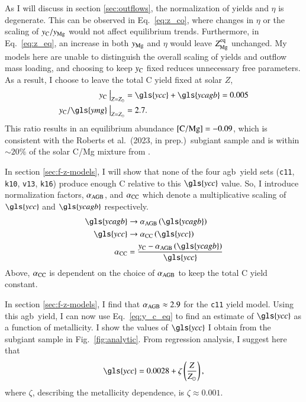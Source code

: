 \documentclass[12pt,oneside,letterpaper]{report}
\newcommand{\agb}{\gls{agb}}
\newcommand{\cxi}{\texttt{\gls{c11}}}
\newcommand{\kx}{\texttt{\gls{k10}}}
\newcommand{\kxvi}{\texttt{\gls{k16}}}
\newcommand{\vxiii}{\texttt{\gls{v13}}}
\newcommand{\Ycc}{\gls{ycc}}
\newcommand{\Yoc}{\gls{ymg}}
\newcommand{\Ycagb}{\gls{ycagb}}
\newcommand{\Yct}{\ensuremath{y_{\rm C}}}
\newcommand{\citetjack}{Roberts et al.~(2023, in prep.)}
\newcommand{\about}[1]{${\sim} #1$}
\begin{document}
As I will discuss in section \ref{sec:outflows}, the normalization of yields and $\eta$ is degenerate. This can be observed in Eq.~\ref{eq:z_co}, where changes in $\eta$ or the scaling of $y_{\rm C}/y_{\rm Mg}$ would not affect equilibrium trends. Furthermore, in Eq.~\ref{eq:z_eq}, an increase in both $y_{\rm Mg}$ and $\eta$ would leave $Z_{\rm Mg}^{\rm eq}$ unchanged. My models here are unable to distinguish the overall scaling of yields and outflow mass loading, and choosing to keep $y_{\rm C}$ fixed reduces unnecessary free parameters. 
%
As a result, I choose to leave the total C yield fixed at solar $Z$,
\begin{subequations}
    \begin{align}
        \Yct~\big\vert_{Z=Z_\odot} &= \Ycc + \Ycagb = 0.005 \\
        \Yct/\Yoc~\big\vert_{Z=Z_\odot} &= 2.7.
    \end{align}
\end{subequations}
This ratio results in an equilibrium abundance ${\rm [C/Mg]} = -0.09$, which is consistent with the \citetjack~\gls{subgiant} sample and is within \about{20\%} of the solar C/Mg mixture from \citet{asplund+09}.

In section \ref{sec:f-z-models}, I will show that none of the four \agb\ yield sets (\cxi{}, \kx{}, \vxiii{}, \kxvi{}) produce enough C relative to this $\Ycc$ value. So, I introduce normalization factors, $\alpha_{\rm AGB}$, and $\alpha_{\rm CC}$ which denote a multiplicative scaling of $\Ycc$ and $\Ycagb$ respectively. 
\begin{subequations} \label{eq:alpha}
    \begin{align}
        \Ycagb &\rightarrow \alpha_{\rm AGB} \left(\Ycagb\right) \\
        \Ycc &\rightarrow \alpha_{\rm CC} \left(\Ycc\right)\\
        \alpha_{\rm CC} &= \frac{\Yct - \alpha_{\rm AGB} \left(\Ycagb\right)}{\Ycc}
    \end{align}
\end{subequations}
Above, $\alpha_{\rm CC}$ is dependent on the choice of $\alpha_{\rm AGB}$ to keep the total C yield constant. 

In section \ref{sec:f-z-models}, I find that $\alpha_{\rm AGB}\approx 2.9$ for the \cxi{} yield model. Using this \agb\ yield, I can now use Eq.~\ref{eq:y_c_eq} to find an estimate of $\Ycc$ as a function of metallicity. I show the values of $\Ycc$ I obtain from the \gls{subgiant} sample in Fig.~\ref{fig:analytic}. From regression analysis, I suggest here that
\begin{equation}\label{eq:zeta}
    \Ycc = 0.0028 + \zeta\left(\frac{Z}{Z_\odot}\right),
\end{equation}
where $\zeta$, describing the metallicity dependence, is $\zeta\approx0.001$.
\end{document}
